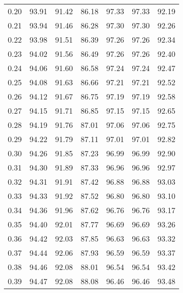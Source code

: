 \begin{tabular}{|c|c|c|c|c|c|c|}
      0.20 &     93.91 &     91.42 &      86.18 &   97.33 &      97.33 &         92.19 \\
      0.21 &     93.94 &     91.46 &      86.28 &   97.30 &      97.30 &         92.26 \\
      0.22 &     93.98 &     91.51 &      86.39 &   97.26 &      97.26 &         92.34 \\
      0.23 &     94.02 &     91.56 &      86.49 &   97.26 &      97.26 &         92.40 \\
      0.24 &     94.06 &     91.60 &      86.58 &   97.24 &      97.24 &         92.47 \\
      0.25 &     94.08 &     91.63 &      86.66 &   97.21 &      97.21 &         92.52 \\
      0.26 &     94.12 &     91.67 &      86.75 &   97.19 &      97.19 &         92.58 \\
      0.27 &     94.15 &     91.71 &      86.85 &   97.15 &      97.15 &         92.65 \\
      0.28 &     94.19 &     91.76 &      87.01 &   97.06 &      97.06 &         92.75 \\
      0.29 &     94.22 &     91.79 &      87.11 &   97.01 &      97.01 &         92.82 \\
      0.30 &     94.26 &     91.85 &      87.23 &   96.99 &      96.99 &         92.90 \\
      0.31 &     94.30 &     91.89 &      87.33 &   96.96 &      96.96 &         92.97 \\
      0.32 &     94.31 &     91.91 &      87.42 &   96.88 &      96.88 &         93.03 \\
      0.33 &     94.33 &     91.92 &      87.52 &   96.80 &      96.80 &         93.10 \\
      0.34 &     94.36 &     91.96 &      87.62 &   96.76 &      96.76 &         93.17 \\
      0.35 &     94.40 &     92.01 &      87.77 &   96.69 &      96.69 &         93.26 \\
      0.36 &     94.42 &     92.03 &      87.85 &   96.63 &      96.63 &         93.32 \\
      0.37 &     94.44 &     92.06 &      87.93 &   96.59 &      96.59 &         93.37 \\
      0.38 &     94.46 &     92.08 &      88.01 &   96.54 &      96.54 &         93.42 \\
      0.39 &     94.47 &     92.08 &      88.08 &   96.46 &      96.46 &         93.48 \\

\end{tabular}
